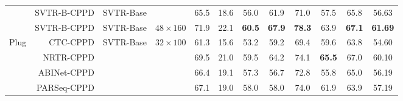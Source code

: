 \documentclass[10pt,journal,compsoc]{IEEEtran}
\begin{document}
\begin{table*}[t]
{\begin{tabular}{c|r|c|c|ccccccc|c}
                      & SVTR-B-CPPD  & SVTR-Base    &  & 65.5                 & 18.6                                                      & 56.0                 & 61.9                 & 71.0                 & 57.5                                                   & 65.8                 & 56.63                                             \\
\cline{4-4} & SVTR-B-CPPD  & SVTR-Base &   $48\times160$  & 71.9 & 22.1 & \textbf{60.5} & \textbf{67.9} & \textbf{78.3} & 63.9 & \textbf{67.1}                                                                       & \textbf{61.69}                                                                                 \\
\hline
\multirow{4}{*}{Plug} & CTC-CPPD & \multirow{4}{*}{SVTR-Base} & \multirow{4}{*}{$32\times100$}   & 61.3                 & 15.6                                                      & 53.2                 & 59.2                 & 69.4                 & 59.6                                                   & 63.8                 & 54.60                                             \\
                      & NRTR-CPPD &  & & 69.5                 & 21.0                                                      & 59.5                 & 64.2                 & 74.1                 & \textbf{65.5}                                                   & 67.0                 & 60.10                                             \\
                      & ABINet-CPPD &  & & 66.4                 & 19.1                                                      & 57.3                 & 56.7                 & 72.8                 & 55.8                                                   & 65.0                 & 56.19                                             \\
                      & PARSeq-CPPD &  & & 67.1                 & 19.0                                                      & 58.0                 & 58.0                 & 74.0                 & 61.9                                                   & 63.9                 & 57.19                                            
  \\

                      \hline
\end{tabular}
}

\label{tab:difficult_result}
\end{table*}
\end{document}

